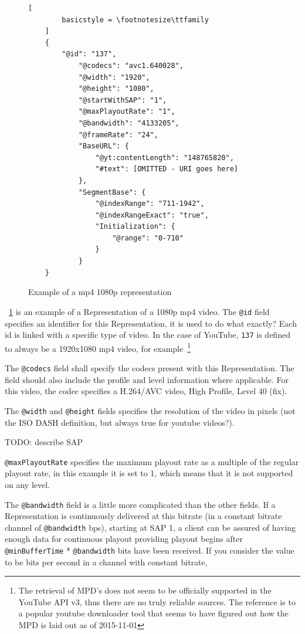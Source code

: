 \begin{figure}
    \centering
    \begin{lstlisting}[
        basicstyle = \footnotesize\ttfamily
    ]
    {
        "@id": "137",
            "@codecs": "avc1.640028",
            "@width": "1920",
            "@height": "1080",
            "@startWithSAP": "1",
            "@maxPlayoutRate": "1",
            "@bandwidth": "4133205",
            "@frameRate": "24",
            "BaseURL": {
                "@yt:contentLength": "148765820",
                "#text": [OMITTED - URI goes here]
            },
            "SegmentBase": {
                "@indexRange": "711-1942",
                "@indexRangeExact": "true",
                "Initialization": {
                    "@range": "0-710"
                }
            }
    }
    \end{lstlisting}
    \caption{Example of a mp4 1080p representation}
    \label{fig:dash-1080p-representation}
\end{figure}

~\ref{fig:dash-1080p-representation} is an example of a Representation of a 1080p mp4 video. The \texttt{@id}
field specifies an identifier for this Representation, it is used to do
what exactly? Each id is linked with a specific type of video. In the case of
YouTube, \texttt{137} is defined to always be a 1920x1080 mp4 video, for
example~\cite[line 303]{youtube-dl:youtube.py}\footnote{The retrieval of MPD's
does not seem to be officially supported in the YouTube API v3, thus there are
no truly reliable sources. The reference is to a popular youtube downloader tool
that seems to have figured out how the MPD is laid out as of 2015-11-01}

The \texttt{@codecs} field shall specify the codecs present with this
Representation. The field should also include the profile and level
information where applicable. For this video, the codec specifies a
H.264/AVC video, High Profile, Level 40 (fix).

The \texttt{@width} and \texttt{@height} fields specifies the resolution of the video in
pixels (not the ISO DASH definition, but always true for youtube
videos?).

TODO: describe SAP

\texttt{@maxPlayoutRate} specifies the maximum playout rate as a multiple of the
regular playout rate, in this example it is set to 1, which means that
it is not supported on any level.

The \texttt{@bandwidth} field is a little more complicated than the other fields.
If a Representation is continuously delivered at this bitrate (in a
constant bitrate channel of \texttt{@bandwidth} bps), starting at SAP 1, a client
can be assured of having enough data for continuous playout providing
playout begins after \texttt{@minBufferTime} * \texttt{@bandwidth} bits have been
received. If you consider the value to be bits per second in a channel
with constant bitrate,

